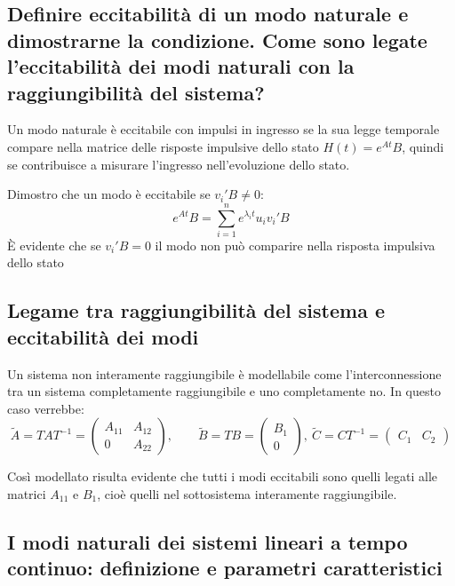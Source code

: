 \documentclass{article}
\begin{document}
\subsection{Definire eccitabilità di un modo naturale e dimostrarne la condizione. Come sono legate l'eccitabilità dei modi naturali con la raggiungibilità del sistema?}
Un modo naturale è eccitabile con impulsi in ingresso se la sua legge temporale compare
nella matrice delle risposte impulsive dello stato $ H(t)=e^{A t}B$,
quindi se contribuisce a misurare l'ingresso nell'evoluzione dello stato.

Dimostro che un modo è eccitabile se $v_i'B\neq 0$:
\[ e^{At}B = \sum_{i=1}^{n}e^{\lambda_i t} u_i v_i'B \]
È evidente che se  $v_i'B = 0$ il modo non può comparire nella risposta impulsiva dello stato


\subsection{Legame tra raggiungibilità del sistema e eccitabilità dei modi}

Un sistema non interamente raggiungibile è modellabile come l'interconnessione tra un sistema
completamente raggiungibile e uno completamente no.
In questo caso verrebbe: 
\[
\widetilde{A} = TAT^{-1}= \begin{pmatrix}
A_{11} & A_{12}\\
0 & A_{22}
\end{pmatrix}
,
\hspace{2em}
\widetilde{B} = TB = \begin{pmatrix}
B_1\\
0
\end{pmatrix},\ 
\widetilde{C}= CT^{-1} = \begin{pmatrix}
C_1 & C_2
\end{pmatrix}
\]

Così modellato risulta evidente che tutti i modi eccitabili sono quelli legati alle matrici $A_{11}$ e $B_1$,
cioè quelli nel sottosistema interamente raggiungibile.


\subsection{I modi naturali dei sistemi lineari a tempo continuo: definizione e parametri caratteristici}
\end{document}
